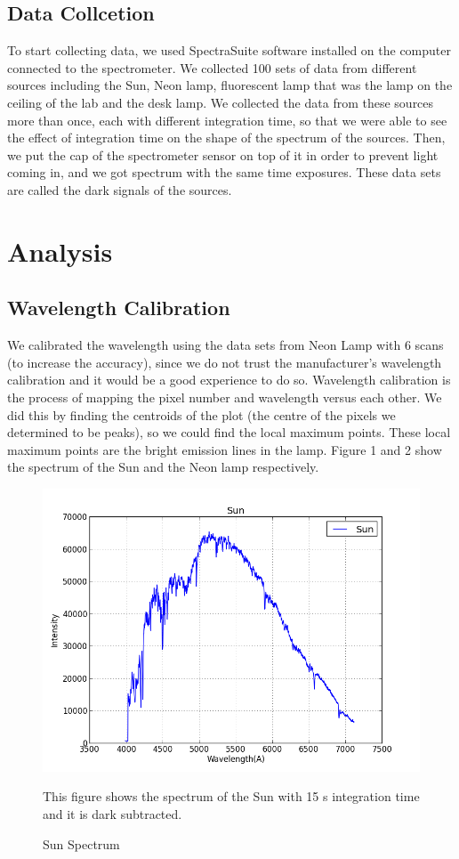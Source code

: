 \documentclass[letterpaper,12pt]{article}
\begin{document}
\subsection{Data Collcetion}
To start collecting data, we used SpectraSuite software installed on the computer connected to the spectrometer. We collected 100 sets of data from different sources including the Sun, Neon lamp, fluorescent lamp that was the lamp on the ceiling of the lab and the desk lamp. We collected the data from these sources more than once, each with different integration time, so that we were able to see the effect of integration time on the shape of the spectrum of the sources.
Then, we put the cap of the spectrometer sensor on top of it in order to prevent light coming in, and we got spectrum with the same time exposures. These data sets are called the dark signals of the sources. 



\section{Analysis}
\label{analysis}
\subsection{Wavelength Calibration}
We calibrated the wavelength using the data sets from Neon Lamp with 6 scans (to increase the accuracy), since we do not trust the manufacturer's wavelength calibration and it would be a good experience to do so. Wavelength calibration is the process of mapping the pixel number and wavelength versus each other. We did this by finding the centroids of the plot (the centre of the pixels we determined to be peaks), so we could find the local maximum points. These local maximum points are the bright emission lines in the lamp. Figure 1 and 2 show the spectrum of the Sun and the Neon lamp respectively. 


\FloatBarrier
\begin{figure}
\centering
\includegraphics[scale=0.5]{sun_wavelength.png}
\caption{Sun Spectrum}
This figure shows the spectrum of the Sun with 15 s integration time and it is dark subtracted.
\end{figure}
\FloatBarrier
\end{document}
